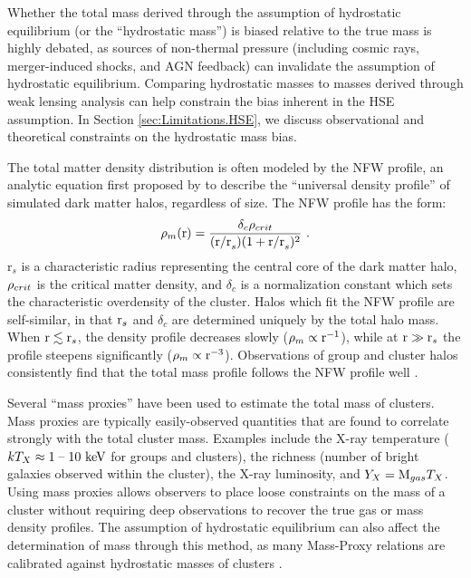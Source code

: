 Whether the total mass derived through the assumption of hydrostatic
equilibrium (or the ``hydrostatic mass'') is biased relative to the
true mass is highly debated, as sources of non-thermal pressure
(including cosmic rays, merger-induced shocks, and AGN feedback) can
invalidate the assumption of hydrostatic equilibrium. Comparing
hydrostatic masses to masses derived through weak lensing analysis can
help constrain the bias inherent in the HSE assumption. In Section
\ref{sec:Limitations.HSE}, we discuss observational and theoretical
constraints on the hydrostatic mass bias.

The total matter density distribution is often modeled by the NFW
profile, an analytic equation first proposed by \citet{Navarro1996}
to describe the ``universal density profile'' of simulated dark matter
halos, regardless of size. The NFW profile has the form:
\begin{equation}
\rho_m(\textrm{r}) = \frac{\delta_c\rho_{crit}}{(\textrm{r/r}_s)(1 + \textrm{r/r}_s)^2}~.\nonumber
\end{equation}
r$_s$ is a characteristic radius representing the central core of the
dark matter halo, $\rho_{crit}$ is the critical matter density, and
$\delta_c$ is a normalization constant which sets the characteristic
overdensity of the cluster. Halos which fit the NFW profile are
self-similar, in that $\textrm{r}_s$ and $\delta_c$ are determined
uniquely by the total halo mass. When $\textrm{r} \lesssim \textrm{r}_s$, the
density profile decreases slowly ($\rho_m \propto \textrm{r}^{-1}$),
while at $\textrm{r} \gg \textrm{r}_s$ the profile steepens significantly ($\rho_m
\propto \textrm{r}^{-3}$). Observations of group and cluster halos
consistently find that the total mass profile follows the NFW profile
well .

Several ``mass proxies'' have been used to estimate the total mass of
clusters. Mass proxies are typically easily-observed quantities that
are found to correlate strongly with the total cluster mass. Examples
include the X-ray temperature ($kT_X\approx1\;\textrm{--}\;10~\textrm{keV}{}$ for groups
and clusters), the richness (number of bright galaxies observed within
the cluster), the X-ray luminosity, and $Y_X = \textrm{M}_{gas}T_X$. Using
mass proxies allows observers to place loose constraints on the mass
of a cluster without requiring deep observations to recover the true
gas or mass density profiles. The assumption of hydrostatic
equilibrium can also affect the determination of mass through this
method, as many Mass-Proxy relations are calibrated against
hydrostatic masses of clusters .

